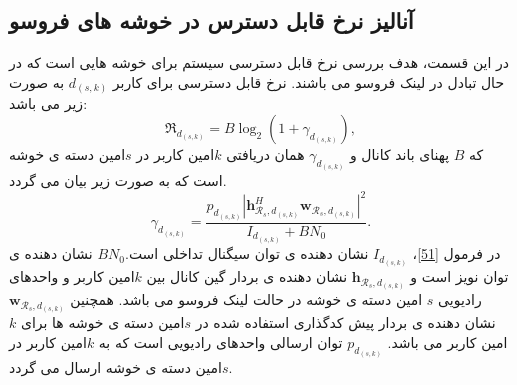  \subsection{آنالیز نرخ قابل دسترس در خوشه های فروسو}
در این قسمت، هدف بررسی نرخ قابل دسترسی سیستم برای خوشه هایی است که در حال تبادل در لینک فروسو می باشند.
 نرخ قابل دسترسی برای کاربر $d_{(s,k)}$ به صورت زیر می باشد:
\begin{equation}\label{e1}
\mathfrak{R}_{d_{(s,k)}} = B \log_2(1+\gamma_{d_{(s,k)}}),
\end{equation}
که $B$ پهنای باند کانال و $\gamma_{d_{(s,k)}}$ همان  دریافتی $k$امین کاربر در $s$امین دسته ی خوشه است که به صورت زیر بیان می گردد.  
\begin{equation}\label{51}
\gamma_{d_{(s,k)}}= \frac{p_{d_{(s,k)}}|\boldsymbol{h}_{\mathcal{R}_s, d_{(s,k)}}^H \boldsymbol{w}_{\mathcal{R}_{s},d_{(s,k)}}|^2}{I_{d_{(s,k)}}+BN_0}.
\end{equation}
در فرمول \eqref{51}، 
$I_{d_{(s,k)}}$
نشان دهنده ی توان سیگنال تداخلی است.$BN_0$
نشان دهنده ی توان نویز است و
$\boldsymbol{h}_{\mathcal{R}_s, d_{(s,k)}}$ 
 نشان دهنده ی بردار گین کانال بین $k$امین کاربر و واحدهای رادیویی
 $s$
 امین دسته ی خوشه در حالت لینک فروسو می باشد. همچنین 
 $\boldsymbol{w}_{\mathcal{R}_{s},d_{(s,k)}}$
 نشان دهنده ی بردار پیش کدگذاری استفاده شده در $s$امین دسته ی خوشه ها برای $k$امین کاربر می باشد. 
 $p_{d_{(s,k)}}$
 توان ارسالی واحدهای رادیویی است که به $k$امین کاربر در $s$امین دسته ی خوشه ارسال می گردد.


